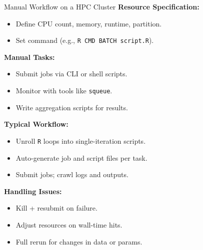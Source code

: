 \documentclass[10pt,compress,t,notes=noshow, xcolor=table]{beamer}
\begin{document}
\begin{frame}[fragile]{Manual Workflow on a HPC Cluster}
\textbf{Resource Specification:}
\begin{itemize}
  \item Define CPU count, memory, runtime, partition.
  \item Set command (e.g., \texttt{R CMD BATCH script.R}).
\end{itemize}

\textbf{Manual Tasks:}
\begin{itemize}
  \item Submit jobs via CLI or shell scripts.
  \item Monitor with tools like \texttt{squeue}.
  \item Write aggregation scripts for results.
\end{itemize}

\textbf{Typical Workflow:}
\begin{itemize}
  \item Unroll \texttt{R} loops into single-iteration scripts.
  \item Auto-generate job and script files per task.
  \item Submit jobs; crawl logs and outputs.
\end{itemize}

\textbf{Handling Issues:}
\begin{itemize}
  \item Kill + resubmit on failure.
  \item Adjust resources on wall-time hits.
  \item Full rerun for changes in data or params.
\end{itemize}
\end{frame}
\end{document}
